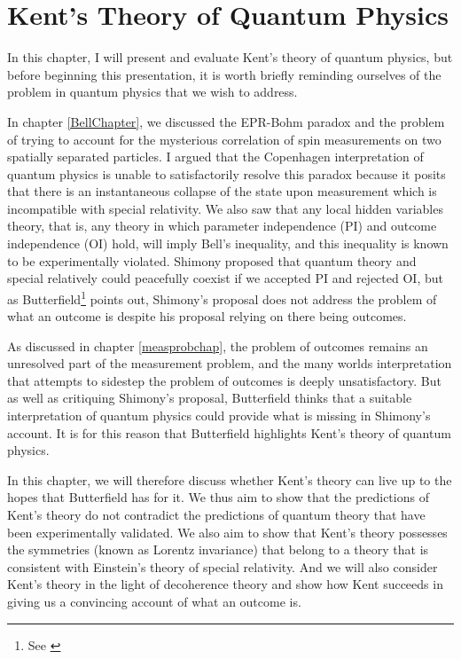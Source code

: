 \chapter{Kent's Theory of Quantum Physics\label{kentchapter}}
In this chapter, I will present and evaluate Kent's theory of quantum physics, but before beginning this presentation, it is worth briefly reminding ourselves of the problem in quantum physics that we wish to address. 

In chapter \ref{BellChapter}, we discussed the EPR-Bohm paradox and the problem of trying to account for the mysterious correlation of spin measurements on two spatially separated particles. I argued that the Copenhagen interpretation of quantum physics is unable to satisfactorily resolve this paradox because it posits that there is an instantaneous collapse of the state upon measurement which is incompatible with special relativity. We also saw that any local hidden variables theory, that is, any theory in which parameter independence (PI) and outcome independence (OI) hold, will imply Bell's inequality, and this inequality is known to be experimentally violated. Shimony proposed that quantum theory and special relatively could peacefully coexist if we accepted PI and rejected OI, but as Butterfield\footnote{See \cite{Butterfield}} points out, Shimony's proposal  does not address the problem of what an outcome is despite his proposal relying on there being outcomes. 

As discussed in chapter \ref{measprobchap}, the problem of outcomes remains an unresolved part of the measurement problem, and the many worlds interpretation that attempts to sidestep the problem of outcomes is deeply unsatisfactory. But as well as critiquing Shimony's proposal, Butterfield thinks that a suitable interpretation of quantum physics could provide what is missing in Shimony's account. It is for this reason that Butterfield highlights Kent's theory of quantum physics.

In this chapter, we will therefore discuss whether Kent's theory can live up to the hopes that Butterfield has for it. We thus aim to show that the predictions of Kent's theory do not contradict the  predictions of quantum theory that have been experimentally validated. We also aim to show that Kent's theory possesses the symmetries (known as Lorentz invariance) that belong to a theory that is consistent with Einstein's theory of special relativity. And we will also consider Kent's theory in the light of decoherence theory and show how Kent succeeds in giving us a convincing account of what an outcome is. 


